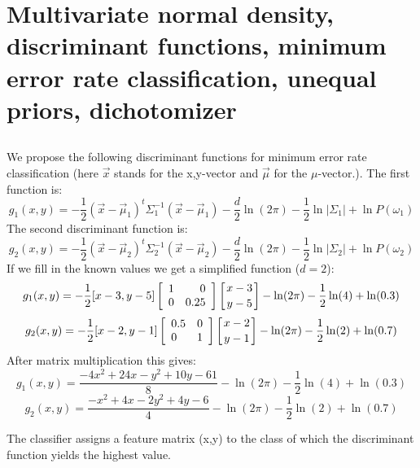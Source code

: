 \documentclass[10pt]{article}
\begin{document}
\section{Multivariate normal density, discriminant functions, minimum error rate classification, unequal priors, dichotomizer}
\subsection{}
We propose the following discriminant functions for minimum error rate classification (here $\vec x$ stands for the x,y-vector and $\vec\mu$ for the $\mu$-vector.). The first function is:
\begin{equation}
g_1(x, y)=-\frac{1}{2}(\vec x-\vec\mu_1)^t\Sigma_1^{-1}(\vec x-\vec\mu_1)-\frac{d}{2}\ln(2\pi)-\frac{1}{2}\ln|\Sigma_1|+\ln P(\omega_1)
\end{equation}
The second discriminant function is:
\begin{equation}
g_2(x, y)=-\frac{1}{2}(\vec x-\vec\mu_2)^t\Sigma_2^{-1}(\vec x-\vec\mu_2)-\frac{d}{2}\ln(2\pi)-\frac{1}{2}\ln|\Sigma_2|+\ln P(\omega_2)
\end{equation}
If we fill in the known values we get a simplified function ($d=2$):
\begin{equation}
g_1(x, y)=
-\frac{1}{2}[x-3, y-5] 
\left[\begin{array}{lr}1 & 0 \\0 & 0.25 \end{array}\right] 
\left[x-3 \atop y-5\right]-\ln(2\pi)-\frac{1}{2}\ln(4)+\ln (0.3)
\end{equation}
\begin{equation}
g_2(x, y)=-\frac{1}{2}[x-2,y-1]
\left[\begin{array}{lr}0.5 & 0 \\0 & 1 \end{array}\right] 
\left[x-2 \atop y-1\right]-\ln(2\pi)-\frac{1}{2}\ln(2)+\ln (0.7)
\end{equation}
After matrix multiplication this gives:
\begin{equation}
g_1(x, y)= \frac{-4x^2+24x-y^2+10y-61}{8}
-\ln(2\pi)-\frac{1}{2}\ln(4)+\ln (0.3)
\end{equation}
\begin{equation}
g_2(x, y)= \frac{-x^2+4x-2y^2+4y-6}{4}
-\ln(2\pi)-\frac{1}{2}\ln(2)+\ln (0.7)
\end{equation}

The classifier assigns a feature matrix (x,y) to the class of which the discriminant function yields the highest value.
\end{document}
